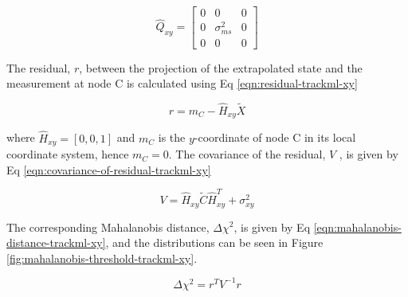 \begin{equation}
\hat{Q}_{xy} = \begin{bmatrix} 
                0 & 0 & 0 \\ 
                0 & \sigma_{ms}^2 & 0 \\
                0 & 0 & 0 \end{bmatrix} 
\label{eqn:process-noise-Q-extrapolation-xy}
\end{equation}

The residual, $r$, between the projection of the extrapolated state and the measurement at node C is calculated using Eq \eqref{eqn:residual-trackml-xy}

\begin{equation}
r = m_C - \hat{H}_{xy} \tilde{X}
\label{eqn:residual-trackml-xy}
\end{equation}

where $\hat{H}_{xy} = [0, 0, 1]$ and $m_C$ is the $y$-coordinate of node C in its local coordinate system, hence $m_C = 0$. The covariance of the residual, $V$ , is given by Eq \eqref{eqn:covariance-of-residual-trackml-xy}

\begin{equation}
{V} = \hat{H}_{xy} \widetilde{C} \hat{H}^{T}_{xy} + \sigma_{xy}^{2}
\label{eqn:covariance-of-residual-trackml-xy}
\end{equation}

The corresponding Mahalanobis distance, $\Delta \chi^{2}$, is given by Eq \eqref{eqn:mahalanobis-distance-trackml-xy}, and the distributions can be seen in Figure \ref{fig:mahalanobis-threshold-trackml-xy}.

\begin{equation}
\Delta \chi^{2} = r^{T} {V}^{-1} r
\label{eqn:mahalanobis-distance-trackml-xy}
\end{equation}




